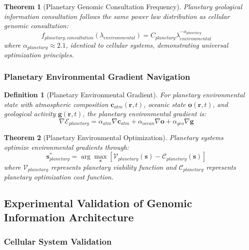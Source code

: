 \documentclass[12pt,a4paper]{article}
\newtheorem{theorem}{Theorem}
\newtheorem{definition}{Definition}
\begin{document}
\begin{theorem}[Planetary Genomic Consultation Frequency]
Planetary geological information consultation follows the same power law distribution as cellular genomic consultation:
\begin{equation}
f_{planetary,consultation}(\lambda_{environmental}) = C_{planetary} \lambda_{environmental}^{-\alpha_{planetary}}
\end{equation}
where $\alpha_{planetary} \approx 2.1$, identical to cellular systems, demonstrating universal optimization principles.
\end{theorem}

\subsubsection{Planetary Environmental Gradient Navigation}

\begin{definition}[Planetary Environmental Gradient]
For planetary environmental state with atmospheric composition $\mathbf{c}_{atm}(\mathbf{r}, t)$, oceanic state $\mathbf{o}(\mathbf{r}, t)$, and geological activity $\mathbf{g}(\mathbf{r}, t)$, the planetary environmental gradient is:
\begin{equation}
\nabla \mathcal{E}_{planetary} = \alpha_{atm} \nabla \mathbf{c}_{atm} + \alpha_{ocean} \nabla \mathbf{o} + \alpha_{geo} \nabla \mathbf{g}
\end{equation}
\end{definition}

\begin{theorem}[Planetary Environmental Optimization]
Planetary systems optimize environmental gradients through:
\begin{equation}
\mathbf{s}_{planetary}^* = \arg\max_{\mathbf{s}} \left[ \mathcal{V}_{planetary}(\mathbf{s}) - \mathcal{C}_{planetary}(\mathbf{s}) \right]
\end{equation}
where $\mathcal{V}_{planetary}$ represents planetary viability function and $\mathcal{C}_{planetary}$ represents planetary optimization cost function.
\end{theorem}

\subsection{Experimental Validation of Genomic Information Architecture}

\subsubsection{Cellular System Validation}
\end{document}
